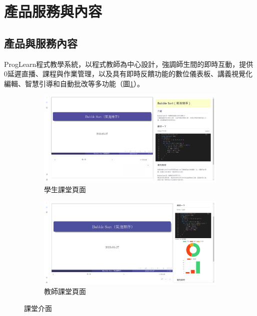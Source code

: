 \section{產品服務與內容}

\subsection{產品與服務內容}

ProgLearn程式教學系統，以程式教師為中心設計，強調師生間的即時互動，提供0延遲直播、課程與作業管理，以及具有即時反饋功能的數位儀表板、講義視覺化編輯、智慧引導和自動批改等多功能（圖\ref{fig:Classroom}）。

\begin{figure}[H]
  \begin{subfigure}{0.5\linewidth}
    \centering
    \includegraphics[width=1\textwidth]{images/student.png}
    \caption{學生課堂頁面}
  \end{subfigure}
  \begin{subfigure}{0.5\linewidth}
    \centering
    \includegraphics[width=1\textwidth]{images/teacher.png}
    \caption{教師課堂頁面}
  \end{subfigure}
  \caption{課堂介面}
  \label{fig:Classroom}
\end{figure}

